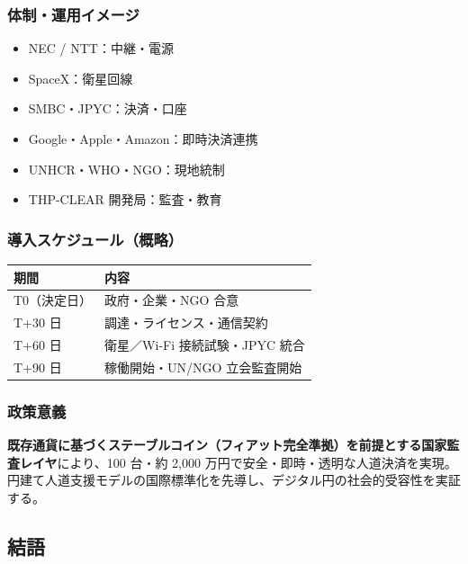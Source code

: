 \documentclass[
]{article}
\providecommand{\tightlist}{%
  \setlength{\itemsep}{0pt}\setlength{\parskip}{0pt}}
\begin{document}
\subsubsection{体制・運用イメージ}\label{ux4f53ux5236ux904bux7528ux30a4ux30e1ux30fcux30b8}

\begin{itemize}
\tightlist
\item
  NEC / NTT：中継・電源\\
\item
  SpaceX：衛星回線\\
\item
  SMBC・JPYC：決済・口座\\
\item
  Google・Apple・Amazon：即時決済連携\\
\item
  UNHCR・WHO・NGO：現地統制\\
\item
  THP-CLEAR 開発局：監査・教育
\end{itemize}

\subsubsection{導入スケジュール（概略）}\label{ux5c0eux5165ux30b9ux30b1ux30b8ux30e5ux30fcux30ebux6982ux7565}

\begin{longtable}[]{@{}ll@{}}
\toprule\noalign{}
期間 & 内容 \\
\midrule\noalign{}
\endhead
\bottomrule\noalign{}
\endlastfoot
T0（決定日） & 政府・企業・NGO 合意 \\
T+30 日 & 調達・ライセンス・通信契約 \\
T+60 日 & 衛星／Wi-Fi 接続試験・JPYC 統合 \\
T+90 日 & 稼働開始・UN/NGO 立会監査開始 \\
\end{longtable}

\subsubsection{政策意義}\label{ux653fux7b56ux610fux7fa9}

\textbf{既存通貨に基づくステーブルコイン（フィアット完全準拠）を前提とする国家監査レイヤ}により、100
台・約 2,000
万円で安全・即時・透明な人道決済を実現。円建て人道支援モデルの国際標準化を先導し、デジタル円の社会的受容性を実証する。

\subsection{結語}\label{ux7d50ux8a9e}
\end{document}
